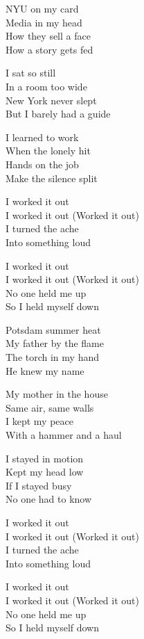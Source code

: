 \begin{lyrics}
NYU on my card\\
Media in my head\\
How they sell a face\\
How a story gets fed

I sat so still\\
In a room too wide\\
New York never slept\\
But I barely had a guide

I learned to work\\
When the lonely hit\\
Hands on the job\\
Make the silence split

I worked it out\\
I worked it out
(Worked it out)\\
I turned the ache\\
Into something loud

I worked it out\\
I worked it out
(Worked it out)\\
No one held me up\\
So I held myself down

Potsdam summer heat\\
My father by the flame\\
The torch in my hand\\
He knew my name

My mother in the house\\
Same air, same walls\\
I kept my peace\\
With a hammer and a haul

I stayed in motion\\
Kept my head low\\
If I stayed busy\\
No one had to know

I worked it out\\
I worked it out
(Worked it out)\\
I turned the ache\\
Into something loud

I worked it out\\
I worked it out
(Worked it out)\\
No one held me up\\
So I held myself down


\end{lyrics}

